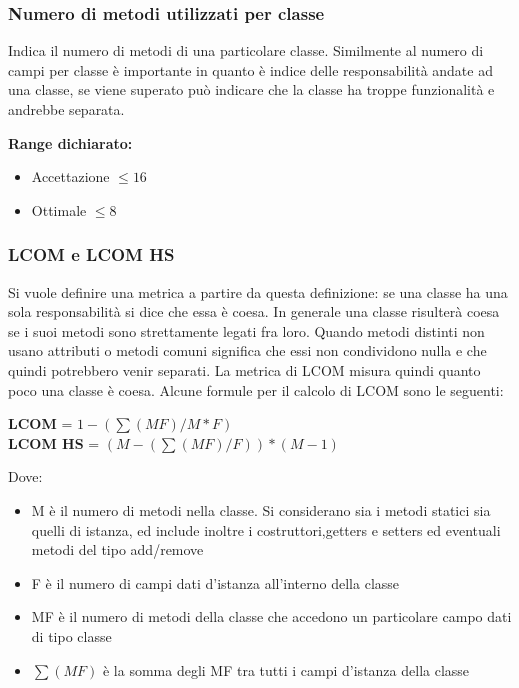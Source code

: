 \subsubsection{Numero di metodi utilizzati per classe}

Indica il numero di metodi di una particolare classe. Similmente al numero di campi
per classe è importante in quanto è indice delle responsabilità andate ad una classe, se
viene superato può indicare che la classe ha troppe funzionalità e andrebbe separata.

\textbf{Range dichiarato:}
\begin{itemize}
\item Accettazione $\leq 16$
\item Ottimale $\leq 8$
\end{itemize}

\subsubsection{LCOM e LCOM HS}

Si vuole definire una metrica a partire da questa definizione: se una classe ha una sola responsabilità si
dice che essa è coesa. In generale una classe risulterà coesa se i suoi metodi sono
strettamente legati fra loro. Quando metodi distinti non usano attributi o metodi
comuni significa che essi non condividono nulla e che quindi potrebbero venir separati.
La metrica di LCOM misura quindi quanto poco una classe è coesa. Alcune formule per il
calcolo di LCOM sono le seguenti:

\begin{center}
\textbf{LCOM} =  $1-(\sum(MF)/M \ast F) $  \\
\textbf{LCOM HS} = $(M-(\sum(MF)/F))\ast(M-1)$
\end{center}

Dove:
\begin{itemize}
\item M è il numero di metodi nella classe. Si considerano sia i metodi statici sia quelli di istanza, ed include inoltre i costruttori,getters e setters ed eventuali metodi del tipo add/remove
\item F è il numero di campi dati d'istanza all'interno della classe 
\item MF è il numero di metodi della classe che accedono un particolare campo dati di tipo classe
\item $\sum(MF)$ è la somma degli MF tra tutti i campi d'istanza della classe
\end{itemize}

